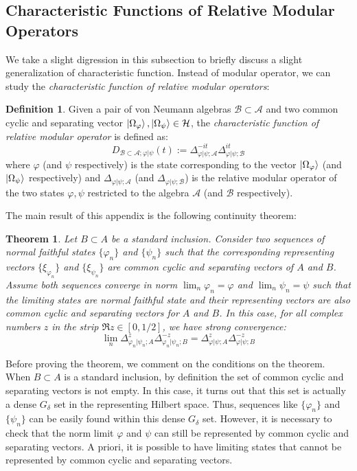 \documentclass[a4paper,11pt]{article}
\newtheorem{theorem}{Theorem}
\theoremstyle{definition}
\newtheorem{definition}{Definition}[section]
\begin{document}
\subsection{Characteristic Functions of Relative Modular Operators}\label{app:relcharacter}
We take a slight digression in this subsection to briefly discuss a slight generalization of characteristic function. Instead of modular operator, we can study the \textit{characteristic function of relative modular operators}:
\begin{definition}
    Given a pair of von Neumann algebras $\mathcal{B}\subset\mathcal{A}$ and two common cyclic and separating vector $\ket{\Omega_\varphi}, \ket{\Omega_\psi}\in\mathcal{H}$, the \textit{characteristic function of relative modular operator} is defined as:
    \begin{equation}
        D_{\mathcal{B}\subset \mathcal{A};\varphi|\psi}(t) := \Delta_{\varphi|\psi;\mathcal{A}}^{-it}\Delta_{\varphi|\psi;\mathcal{B}}^{it}
    \end{equation}
    where $\varphi$ (and $\psi$ respectively) is the state corresponding to the vector $\ket{\Omega_\varphi}$ (and $\ket{\Omega_\psi}$ respectively) and $\Delta_{\varphi|\psi;\mathcal{A}}$ (and $\Delta_{\varphi|\psi;\mathcal{B}}$) is the relative modular operator of the two states $\varphi,\psi$ restricted to the algebra $\mathcal{A}$ (and $\mathcal{B}$ respectively).
\end{definition}
The main result of this appendix is the following continuity theorem:
\begin{theorem}
    Let $B\subset A$ be a standard inclusion. Consider two sequences of normal faithful states $\{\varphi_n\}$ and $\{\psi_n\}$ such that the corresponding representing vectors $\{\xi_{\varphi_n}\}$ and $\{\xi_{\psi_n}\}$ are common cyclic and separating vectors of $A$ and $B$. Assume both sequences converge in norm $\lim_n\varphi_n = \varphi$ and $\lim_n\psi_n = \psi$ such that the limiting states are normal faithful state and their representing vectors are also common cyclic and separating vectors for $A$ and $B$. In this case, for all complex numbers $z$ in the strip $\Re{z}\in[0, 1/2]$, we have strong convergence:
    \begin{equation}
        \lim_n \Delta_{\varphi_n|\psi_n;A}^z \Delta_{\varphi_n|\psi_n;B}^{-z} = \Delta^z_{\varphi|\psi;A}\Delta^{-z}_{\varphi|\psi; B}
    \end{equation}
\end{theorem}
Before proving the theorem, we comment on the conditions on the theorem. When $B\subset A$ is a standard inclusion, by definition the set of common cyclic and separating vectors is not empty. In this case, it turns out that this set is actually a dense $G_\delta$ set in the representing Hilbert space. Thus, sequences like $\{\varphi_n\}$ and $\{\psi_n\}$ can be easily found within this dense $G_\delta$ set. However, it is necessary to check that the norm limit $\varphi$ and $\psi$ can still be represented by common cyclic and separating vectors. A priori, it is possible to have limiting states that cannot be represented by common cyclic and separating vectors.
\end{document}

